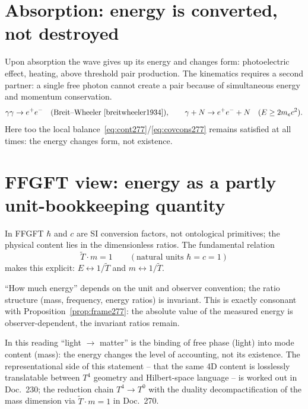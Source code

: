 \section{Absorption: energy is converted, not destroyed}

Upon absorption the wave gives up its energy and changes form: photoelectric
effect, heating, above threshold pair production. The kinematics requires a
second partner: a single free photon cannot create a pair because of
simultaneous energy and momentum conservation.
\begin{equation}
  \gamma\gamma \to e^+ e^-
  \quad(\text{Breit--Wheeler}~\cite{breitwheeler1934}),
  \qquad
  \gamma + N \to e^+ e^- + N
  \quad(E \geq 2 m_e c^2).
  \label{eq:pair277}
\end{equation}
Here too the local balance~\eqref{eq:cont277}/\eqref{eq:covcons277} remains
satisfied at all times: the energy changes form, not existence.

\section{FFGFT view: energy as a partly unit-bookkeeping quantity}

In FFGFT $\hbar$ and $c$ are SI conversion factors, not ontological primitives;
the physical content lies in the dimensionless ratios. The fundamental relation
\begin{equation}
  \tilde T \cdot m = 1
  \qquad(\text{natural units } \hbar = c = 1)
  \label{eq:Tm277}
\end{equation}
makes this explicit: $E \leftrightarrow 1/\tilde T$ and
$m \leftrightarrow 1/\tilde T$.

\begin{insight}
\enquote{How much energy} depends on the unit and observer convention; the
ratio structure (mass, frequency, energy ratios) is invariant. This is exactly
consonant with Proposition~\ref{prop:frame277}: the absolute value of the
measured energy is observer-dependent, the invariant ratios remain.
\end{insight}

In this reading \enquote{light $\to$ matter} is the binding of free phase
(light) into mode content (mass): the energy changes the level of accounting,
not its existence. The representational side of this statement -- that the same
4D content is losslessly translatable between $T^4$ geometry and Hilbert-space
language -- is worked out in Doc.~230; the reduction chain $T^4\to T^0$ with the
duality decompactification of the mass dimension via $\tilde T\cdot m=1$ in
Doc.~270.


